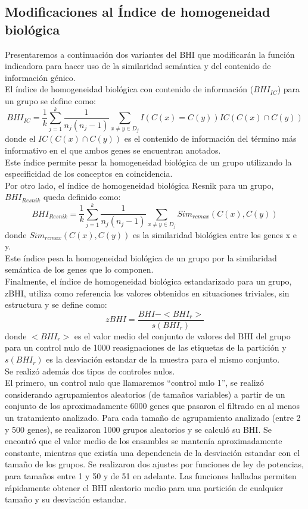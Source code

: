 \subsection{Modificaciones al Índice de homogeneidad biológica}
\label{subsec:control_nulo}
Presentaremos a continuación dos variantes del BHI que modificarán la función indicadora para hacer uso de la similaridad semántica y del contenido de información génico.\\
El índice de homogeneidad biológica con contenido de información ($BHI_{IC}$) para un grupo se define como:
\begin{equation}
	BHI_{IC} = \frac{1}{k}\sum\limits_{j=1}^k\frac{1}{n_j(n_j-1)}\sum\limits_{x\neq y\in D_j}I(C(x)=C(y))IC(C(x)\cap C(y))
\end{equation}
donde el $IC(C(x)\cap C(y))$ es el contenido de información del término más informativo en el que ambos genes se encuentran anotados.\\
Este índice permite pesar la homogeneidad biológica de un grupo utilizando la especificidad de los conceptos en coincidencia.\\
Por otro lado, el índice de homogeneidad biológica Resnik para un grupo, $BHI_{Resnik}$ queda definido como:
\begin{equation}
	BHI_{Resnik} = \frac{1}{k}\sum\limits_{j=1}^k\frac{1}{n_j(n_j-1)}\sum\limits_{x\neq y\in D_j}Sim_{rcmax}(C(x), C(y))
\end{equation}
donde $Sim_{rcmax}(C(x), C(y))$ es la similaridad biológica entre los genes x e y.\\
Este índice pesa la homogeneidad biológica de un grupo por la similaridad semántica de los genes que lo componen.\\
Finalmente, el índice de homogeneidad biológica estandarizado para un grupo, zBHI, utiliza como referencia los valores obtenidos en situaciones triviales, sin estructura y se define como:
\begin{equation}
	zBHI = \frac{BHI-<BHI_r>}{s(BHI_r)}
\end{equation}
donde $<BHI_r>$ es el valor medio del conjunto de valores del BHI del grupo para un control nulo de 1000 reasignaciones de las etiquetas de la partición y $s(BHI_r)$ es la desviación estandar de la muestra para el mismo conjunto.\\
Se realizó además dos tipos de controles nulos.\\
El primero, un control nulo que llamaremos ``control nulo 1'', se realizó considerando agrupamientos aleatorios (de tamaños variables) a partir de un conjunto de los aproximadamente 6000 genes que pasaron el filtrado en al menos un tratamiento analizado. Para cada tamaño de agrupamiento analizado (entre 2 y 500 genes), se realizaron 1000 grupos aleatorios y se calculó su BHI. Se encontró que el valor medio de los ensambles se mantenía aproximadamente constante, mientras que existía una dependencia de la desviación estandar con el tamaño de los grupos. Se realizaron dos ajustes por funciones de ley de potencias, para tamaños entre 1 y 50 y de 51 en adelante. Las funciones halladas permiten rápidamente obtener el BHI aleatorio medio para una partición de cualquier tamaño y su desviación estandar.\\
